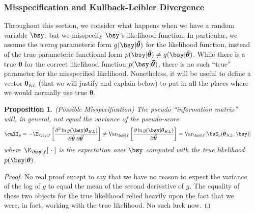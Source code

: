 \documentclass[12pt]{article}
\theoremstyle{plain}
\newtheorem{prop}[thm]{Proposition}
\theoremstyle{definition}
\theoremstyle{remark}
\newcommand{\bstheta}{\boldsymbol{\theta}}
\newcommand{\bstildetheta}{\boldsymbol{\tilde{\theta}}}
\newcommand{\Var}{\operatorname{Var}}
\begin{document}
\subsubsection{Misspecification and Kullback-Leibler Divergence}

Throughout this section, we consider what happens when we have a random
variable $\bsy$, but we misspecify $\bsy$'s likelihood function.
In particular, we assume the \emph{wrong} parameteric form
$g(\bsy|\bstildetheta)$ for the likelihood function, instead of the true
parameteric functional form $p(\bsy|\bstildetheta)\neq
g(\bsy|\bstildetheta)$. While there is a true $\bstheta$ for the correct
likelihood function $p(\bsy|\bstildetheta)$, there is no such ``true''
parameter for the misspecified likelihood. Nonetheless, it will be
useful to define a vector $\bstheta_{KL}$ (that we will justify and
explain below) to put in all the places where we would normally use true
$\bstheta$.

\begin{prop}\emph{(Possible Misspecification)}
The pseudo-``information matrix'' will, in general, not equal the
variance of the pseudo-score
\begin{align*}
  \calI_p
  =
  -\E_{\bsy|f}\left[
    \frac{\partial^2 \ln g(\bsy|\bstheta_{KL})}{%
      \partial\bstildetheta\;\partial\bstildetheta'}
  \right]
  \neq
  \Var_{\bsy|f}\left[
    \frac{\partial \ln g(\bsy|\bstheta_{KL})}{%
      \partial\bstildetheta}
  \right]
  =
  \Var_{\bsy|f}[\bsS_p(\bstheta_{KL},\bsy)]
\end{align*}
where $\E_{\bsy|f}[\;\cdot\;]$ is the expectation over $\bsy$ computed
with the true likelihood $p(\bsy|\bstheta)$.
\end{prop}
\begin{proof}
No real proof except to say that we have no reason to expect the
variance of the log of $g$ to equal the mean of the second derivative of
$g$. The equality of these two objects for the true likelihood relied
heavily upon the fact that we were, in fact, working with the true
likelihood. No such luck now.
\end{proof}
\end{document}
